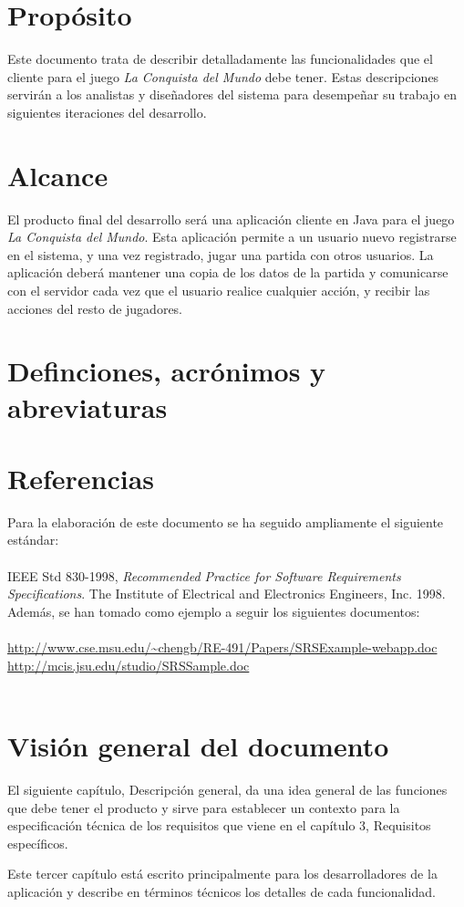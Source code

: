 \section{Propósito}

Este documento trata de describir detalladamente las funcionalidades que el
cliente para el juego \textit{La Conquista del Mundo} debe tener. Estas
descripciones servirán a los analistas y diseñadores del sistema para
desempeñar su trabajo en siguientes iteraciones del desarrollo.

\section{Alcance}

El producto final del desarrollo será una aplicación cliente en Java para el
juego \textit{La Conquista del Mundo}. Esta aplicación permite a un usuario
nuevo registrarse en el sistema, y una vez registrado, jugar una partida con
otros usuarios. La aplicación deberá mantener una copia de los datos de la
partida y comunicarse con el servidor cada vez que el usuario realice cualquier
acción, y recibir las acciones del resto de jugadores.

\section{Definciones, acrónimos y abreviaturas}


\section{Referencias}

Para la elaboración de este documento se ha seguido ampliamente el siguiente
estándar:\\
\\
IEEE Std 830-1998, \textit{Recommended Practice for Software Requirements
Specifications}.
The Institute of Electrical and Electronics Engineers, Inc. 1998.\\

Además, se han tomado como ejemplo a seguir los siguientes documentos:\\
\\
{\small
\url{http://www.cse.msu.edu/~chengb/RE-491/Papers/SRSExample-webapp.doc}\\
\url{http://mcis.jsu.edu/studio/SRSSample.doc}\\
}\\

\section{Visión general del documento}

El siguiente capítulo, Descripción general, da una idea general de las funciones
que debe tener el producto y sirve para establecer un contexto para la
especificación técnica de los requisitos que viene en el capítulo 3, Requisitos
específicos.

Este tercer capítulo está escrito principalmente para los desarrolladores de la
aplicación y describe en términos técnicos los detalles de cada funcionalidad.
